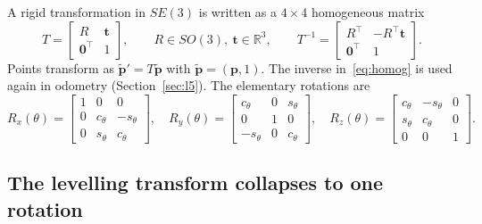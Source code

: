 \documentclass[10pt,a4paper]{scrartcl}
\newcommand{\R}{\mathbb{R}}
\begin{document}
  A rigid transformation in $SE(3)$ is written as a $4\times4$ homogeneous matrix
  \begin{equation}
    T=\begin{bmatrix} R & \bm t\\ \bm 0^\top & 1\end{bmatrix},\qquad
    R\in SO(3),\ \bm t\in\R^3,\qquad
    T^{-1}=\begin{bmatrix} R^\top & -R^\top\bm t\\ \bm 0^\top & 1\end{bmatrix}.
    \label{eq:homog}
  \end{equation}
  Points transform as $\tilde{\bm p}'=T\tilde{\bm p}$ with $\tilde{\bm p}=(\bm p,1)$.
  The inverse in~\eqref{eq:homog} is used again in odometry
  (Section~\ref{sec:l5}). The elementary rotations are
  \begin{equation}
    R_x(\theta)=\begin{bmatrix}1&0&0\\0&c_\theta&-s_\theta\\0&s_\theta&c_\theta\end{bmatrix},\quad
    R_y(\theta)=\begin{bmatrix}c_\theta&0&s_\theta\\0&1&0\\-s_\theta&0&c_\theta\end{bmatrix},\quad
    R_z(\theta)=\begin{bmatrix}c_\theta&-s_\theta&0\\s_\theta&c_\theta&0\\0&0&1\end{bmatrix}.
  \end{equation}

  \subsection{The levelling transform collapses to one rotation}
\end{document}
